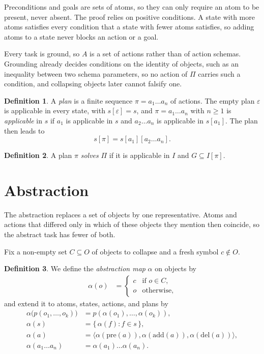 \documentclass{article}
\theoremstyle{definition}
\newtheorem{definition}{Definition}
\theoremstyle{plain}
\theoremstyle{definition}
\begin{document}
Preconditions and goals are sets of atoms, so they can only require an atom to be present, never absent. The proof relies on positive conditions. A state with more atoms satisfies every condition that a state with fewer atoms satisfies, so adding atoms to a state never blocks an action or a goal.

Every task is ground, so $A$ is a set of actions rather than of action schemas. Grounding already decides conditions on the identity of objects, such as an inequality between two schema parameters, so no action of $\Pi$ carries such a condition, and collapsing objects later cannot falsify one.

\begin{definition}
A \emph{plan} is a finite sequence $\pi = a_1 \dots a_n$ of actions. The empty plan $\varepsilon$ is applicable in every state, with $s[\varepsilon] = s$, and $\pi = a_1 \dots a_n$ with $n \geq 1$ is \emph{applicable} in $s$ if $a_1$ is applicable in $s$ and $a_2 \dots a_n$ is applicable in $s[a_1]$. The plan then leads to 
\[
  s[\pi] = s[a_1][a_2 \dots a_n].
\]
\end{definition}

\begin{definition}\label{def:solves}
A plan $\pi$ \emph{solves} $\Pi$ if it is applicable in $I$ and $G \subseteq I[\pi]$.
\end{definition}

\section{Abstraction}

The abstraction replaces a set of objects by one representative. Atoms and actions that differed only in which of these objects they mention then coincide, so the abstract task has fewer of both.

Fix a non-empty set $C \subseteq O$ of objects to collapse and a fresh symbol $c \notin O$.

\begin{definition}\label{def:alpha}
We define the \emph{abstraction map} $\alpha$ on objects by
\begin{align*}
  \alpha(o) &=
  \begin{cases}
    c & \text{if } o \in C,\\
    o & \text{otherwise,}
  \end{cases}
\end{align*}
and extend it to atoms, states, actions, and plans by
\begin{align*}
  \alpha\bigl(p(o_1,\dots,o_k)\bigr) &= p(\alpha(o_1),\dots,\alpha(o_k)),\\
  \alpha(s) &= \{\, \alpha(f) : f \in s \,\},\\
  \alpha(a) &= \langle \alpha(\mathrm{pre}(a)), \alpha(\mathrm{add}(a)), \alpha(\mathrm{del}(a)) \rangle,\\
  \alpha(a_1 \dots a_n) &= \alpha(a_1) \dots \alpha(a_n).
\end{align*}
\end{definition}
\end{document}
